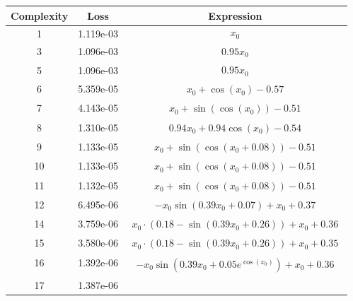 \begin{center}
        \begin{tabular}{|c|c|c|}
        \hline
        Complexity & Loss & Expression \\
        \hline
        1 & 1.119e-03 & $\begin{aligned}x_{0}\end{aligned}$\\ \hline3 & 1.096e-03 & $\begin{aligned}0.95 x_{0}\end{aligned}$\\ \hline5 & 1.096e-03 & $\begin{aligned}0.95 x_{0}\end{aligned}$\\ \hline6 & 5.359e-05 & $\begin{aligned}x_{0} + \cos{\left(x_{0} \right)} - 0.57\end{aligned}$\\ \hline7 & 4.143e-05 & $\begin{aligned}x_{0} + \sin{\left(\cos{\left(x_{0} \right)} \right)} - 0.51\end{aligned}$\\ \hline8 & 1.310e-05 & $\begin{aligned}0.94 x_{0} + 0.94 \cos{\left(x_{0} \right)} - 0.54\end{aligned}$\\ \hline9 & 1.133e-05 & $\begin{aligned}x_{0} + \sin{\left(\cos{\left(x_{0} + 0.08 \right)} \right)} - 0.51\end{aligned}$\\ \hline10 & 1.133e-05 & $\begin{aligned}x_{0} + \sin{\left(\cos{\left(x_{0} + 0.08 \right)} \right)} - 0.51\end{aligned}$\\ \hline11 & 1.132e-05 & $\begin{aligned}x_{0} + \sin{\left(\cos{\left(x_{0} + 0.08 \right)} \right)} - 0.51\end{aligned}$\\ \hline12 & 6.495e-06 & $\begin{aligned}- x_{0} \sin{\left(0.39 x_{0} + 0.07 \right)} + x_{0} + 0.37\end{aligned}$\\ \hline14 & 3.759e-06 & $\begin{aligned}x_{0} \cdot \left(0.18 - \sin{\left(0.39 x_{0} + 0.26 \right)}\right) + x_{0} + 0.36\end{aligned}$\\ \hline15 & 3.580e-06 & $\begin{aligned}x_{0} \cdot \left(0.18 - \sin{\left(0.39 x_{0} + 0.26 \right)}\right) + x_{0} + 0.35\end{aligned}$\\ \hline16 & 1.392e-06 & $\begin{aligned}- x_{0} \sin{\left(0.39 x_{0} + 0.05 e^{\cos{\left(x_{0} \right)}} \right)} + x_{0} + 0.36\end{aligned}$\\ \hline17 & 1.387e-06 & 
\end{tabular}
\end{center}
